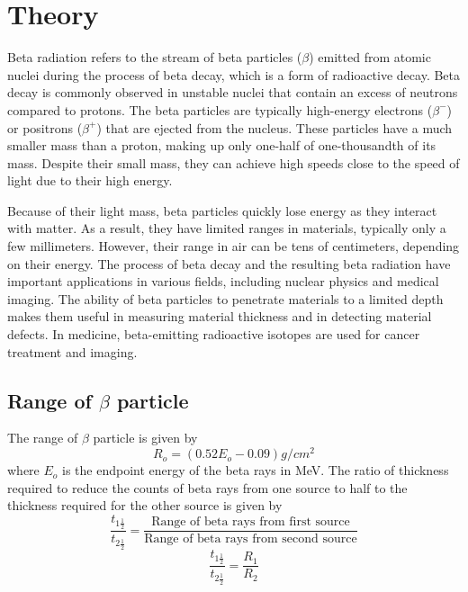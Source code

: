 \section{Theory}

	Beta radiation refers to the stream of beta particles ($\beta$) emitted from atomic nuclei during the process of beta decay, which is a form of radioactive decay. Beta decay is commonly observed in unstable nuclei that contain an excess of neutrons compared to protons. The beta particles are typically high-energy electrons ($\beta^-$) or positrons ($\beta^+$) that are ejected from the nucleus. These particles have a much smaller mass than a proton, making up only one-half of one-thousandth of its mass. Despite their small mass, they can achieve high speeds close to the speed of light due to their high energy.

	Because of their light mass, beta particles quickly lose energy as they interact with matter. As a result, they have limited ranges in materials, typically only a few millimeters. However, their range in air can be tens of centimeters, depending on their energy. The process of beta decay and the resulting beta radiation have important applications in various fields, including nuclear physics and medical imaging. The ability of beta particles to penetrate materials to a limited depth makes them useful in measuring material thickness and in detecting material defects. In medicine, beta-emitting radioactive isotopes are used for cancer treatment and imaging.

	\subsection{Range of $\beta$ particle}
		The range of $\beta$ particle is given by 
		\begin{equation}
			R_o=(0.52E_o-0.09)g/cm^2
		\end{equation}
		where $E_o$ is the endpoint energy of the beta rays in MeV. The ratio of thickness required to reduce the counts of beta rays from one source to half to the thickness required for the other source is given by
		\begin{equation}
			\frac{t_{1\frac{1}{2}}}{t_{2\frac{1}{2}}}=\frac{\text{Range of beta rays from first source}}{\text{Range of beta rays from second source}}
		\end{equation}
		\begin{equation}
			\frac{t_{1\frac{1}{2}}}{t_{2\frac{1}{2}}}=\frac{R_1}{R_2}
		\end{equation}
